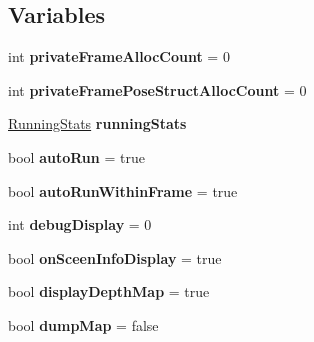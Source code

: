 \subsection*{Variables}
\begin{DoxyCompactItemize}
\item 
\hypertarget{namespacelsd__slam_acb1b5dabc2a2b8c7dccd7985fb5e80b4}{int {\bfseries private\-Frame\-Alloc\-Count} = 0}\label{namespacelsd__slam_acb1b5dabc2a2b8c7dccd7985fb5e80b4}

\item 
\hypertarget{namespacelsd__slam_a09e6d350da70e6afd11094da4a0bd93f}{int {\bfseries private\-Frame\-Pose\-Struct\-Alloc\-Count} = 0}\label{namespacelsd__slam_a09e6d350da70e6afd11094da4a0bd93f}

\item 
\hypertarget{namespacelsd__slam_aa3a7bb8c808e02f5d7bbfc86107d78dd}{\hyperlink{classlsd__slam_1_1_running_stats}{Running\-Stats} {\bfseries running\-Stats}}\label{namespacelsd__slam_aa3a7bb8c808e02f5d7bbfc86107d78dd}

\item 
\hypertarget{namespacelsd__slam_a01beba4d75a9b8eb5bb8d52b4051032a}{bool {\bfseries auto\-Run} = true}\label{namespacelsd__slam_a01beba4d75a9b8eb5bb8d52b4051032a}

\item 
\hypertarget{namespacelsd__slam_a13db94cee5ae609370764555b089af79}{bool {\bfseries auto\-Run\-Within\-Frame} = true}\label{namespacelsd__slam_a13db94cee5ae609370764555b089af79}

\item 
\hypertarget{namespacelsd__slam_aec14e9e02389be3d29fb49a0897853ab}{int {\bfseries debug\-Display} = 0}\label{namespacelsd__slam_aec14e9e02389be3d29fb49a0897853ab}

\item 
\hypertarget{namespacelsd__slam_a9c86173a213174ed1fac6db777b8a0f9}{bool {\bfseries on\-Sceen\-Info\-Display} = true}\label{namespacelsd__slam_a9c86173a213174ed1fac6db777b8a0f9}

\item 
\hypertarget{namespacelsd__slam_ad0105fd77dc9f98855a20c81b19b775f}{bool {\bfseries display\-Depth\-Map} = true}\label{namespacelsd__slam_ad0105fd77dc9f98855a20c81b19b775f}

\item 
\hypertarget{namespacelsd__slam_a2ced2f8c30ff39ec95b166afbbf61076}{bool {\bfseries dump\-Map} = false}\label{namespacelsd__slam_a2ced2f8c30ff39ec95b166afbbf61076}


\end{DoxyCompactItemize}
